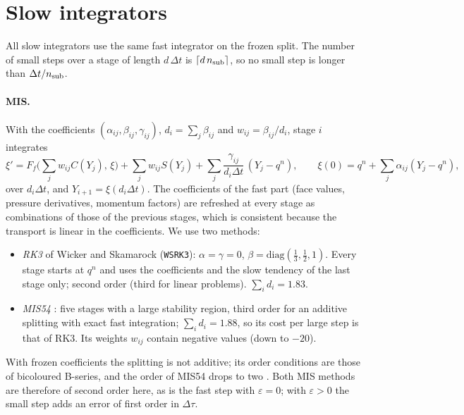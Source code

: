 \documentclass[11pt,a4paper]{article}
\newcommand{\dtau}{\Delta\tau}
\newcommand{\dt}{\Delta t}
\newcommand{\code}[1]{\texttt{\small #1}}
\newcommand{\fs}{\xi}         %
\begin{document}
\section{Slow integrators}\label{sec:slow}
All slow integrators use the same fast integrator on the frozen split. The number of small steps over
a stage of length $d\,\dt$ is $\lceil d\,n_{\rm sub}\rceil$, so no small step is longer than $\dt/n_{\rm sub}$.

\paragraph{MIS.} With the coefficients $(\alpha_{ij},\beta_{ij},\gamma_{ij})$, $d_i=\sum_j\beta_{ij}$ and $w_{ij}=\beta_{ij}/d_i$,
stage $i$ integrates \cite{wkg,knothwensch}
\[
\fs'=F_f\Big(\sum_jw_{ij}C(Y_j),\,\fs\Big)+\sum_jw_{ij}S(Y_j)+\sum_j\frac{\gamma_{ij}}{d_i\dt}\,(Y_j-q^n),\qquad
\fs(0)=q^n+\sum_j\alpha_{ij}(Y_j-q^n),
\]
over $d_i\dt$, and $Y_{i+1}=\fs(d_i\dt)$. The coefficients of the fast part (face values, pressure derivatives,
momentum factors) are refreshed at every stage as combinations of those of the previous stages, which
is consistent because the transport is linear in the coefficients. We use two methods:
\begin{itemize}
\item \emph{RK3} of Wicker and Skamarock \cite{ws} (\code{WSRK3}): $\alpha=\gamma=0$, $\beta=\mathrm{diag}(\tfrac13,\tfrac12,1)$. Every
stage starts at $q^n$ and uses the coefficients and the slow tendency of the last stage only; second
order (third for linear problems). $\sum_id_i=1.83$.
\item \emph{MIS54} \cite{bauer}: five stages with a large stability region, third order for an additive
splitting with exact fast integration; $\sum_id_i=1.88$, so its cost per large step is that of RK3. Its
weights $w_{ij}$ contain negative values (down to $-20$).
\end{itemize}
With frozen coefficients the splitting is not additive; its order conditions are those of bicoloured
B-series, and the order of MIS54 drops to two \cite{bseries}. Both MIS methods are therefore of second
order here, as is the fast step with $\varepsilon=0$; with $\varepsilon>0$ the small step adds an error of first order in
$\dtau$.
\end{document}
